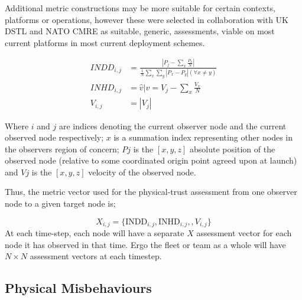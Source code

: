 Additional metric constructions may be more suitable for certain contexts, platforms or operations, however these were selected in collaboration with UK DSTL and NATO CMRE as suitable, generic, assessments, viable on most current platforms in most current deployment schemes.

\begin{align}
  INDD_{i,j} &= \frac{|P_j - \sum_x \frac{P_x}{N}|}{\frac{1}{N}\sum_x \sum_y{|P_x - P_y| (\forall x \neq y)}}\\
  INHD_{i,j} &= \hat{v} \vert v= V_j - \sum_x{\frac{V_x}{N}}\\
  V_{i,j} &= |V_j|
\end{align}

Where $i$ and $j$ are indices denoting the current observer node and the current observed node respectively; $x$ is a summation index representing other nodes in the observers region of concern; $P{j}$ is the $[x,y,z]$ absolute position of the observed node (relative to some coordinated origin point agreed upon at launch) and $V{j}$ is the $[x,y,z]$ velocity of the observed node.

Thus, the metric vector used for the physical-trust assessment from one observer node to a given target node is;

\begin{equation}
  X_{i,j}=\{\text{INDD}_{i,j}, \text{INHD}_{i,j},, V_{i,j}\}
  \label{eq:phys_vector}
\end{equation}
At each time-step, each node will have a separate $X$ assessment vector for each node it has observed in that time. 
Ergo the fleet or team as a whole will have $N\times N$ assessment vectors at each timestep.

\subsection{Physical Misbehaviours}

